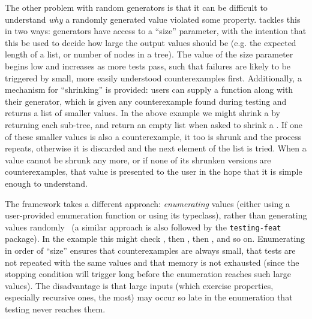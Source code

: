 The other problem with random generators is that it can be difficult to
understand \emph{why} a randomly generated value violated some property.
\quickcheck{} tackles this in two ways: generators have access to a
``size'' parameter, with the intention that this be used to decide how large the
output values should be (e.g. the expected length of a list, or number of nodes
in a tree). The value of the size parameter begins low and increases as more
tests pass, such that failures are likely to be triggered by small, more easily
understood counterexamples first. Additionally, a mechanism for ``shrinking'' is
provided: users can supply a  function along with their generator,
which is given any counterexample found during testing and returns a list of
smaller values. In the above example we might shrink a  by returning
each sub-tree, and return an empty list when asked to shrink a . If one
of these smaller values is also a counterexample, it too is shrunk and the
process repeats, otherwise it is discarded and the next element of the list is
tried. When a value cannot be shrunk any more, or if none of its shrunken
versions are counterexamples, that value is presented to the user in the hope
that it is simple enough to understand.

The \smallcheck{} framework takes a different approach: \emph{enumerating}
values (either using a user-provided enumeration function or using its
 typeclass), rather than generating values
randomly~\cite{runciman2008smallcheck} (a similar approach is also followed by
the \texttt{testing-feat} package). In the  example this might check
, then , then , and
so on. Enumerating in order of ``size'' ensures that counterexamples are always
small, that tests are not repeated with the same values and that memory is not
exhausted (since the stopping condition will trigger long before the enumeration
reaches such large values). The disadvantage is that large inputs (which
exercise properties, especially recursive ones, the most) may occur so late in
the enumeration that testing never reaches them.


